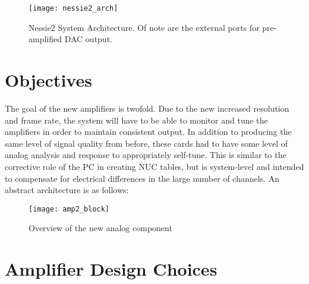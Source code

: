\begin{figure}[!htb]
	\centering
	\texttt{[image: nessie2\_arch]}
	\caption{Nessie2 System Architecture. Of note are the external ports for pre-amplified DAC output.}
\end{figure}

\FloatBarrier

\section{Objectives}
The goal of the new amplifiers is twofold. Due to the new increased resolution and frame rate, the system will have to be able to monitor and tune the amplifiers in order to maintain consistent output. In addition to producing the same level of signal quality from before, these cards had to have some level of analog analysis and response to appropriately self-tune. This is similar to the corrective role of the PC in creating NUC tables, but is system-level and intended to compensate for electrical differences in the large number of channels. An abstract architecture is as follows:
\begin{figure}[!htb]
	\centering
	\texttt{[image: amp2\_block]}
	\caption{Overview of the new analog component}
\end{figure}
\section{Amplifier Design Choices}
